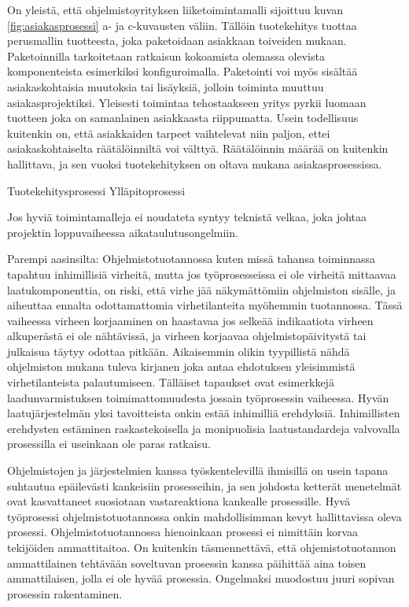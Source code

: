 \documentclass[finnish,12pt,a4paper,pdftex]{article}
\begin{document}
On yleistä, että ohjelmistoyrityksen liiketoimintamalli sijoittuu kuvan \ref{fig:asiakasprosessi} a- ja c-kuvausten väliin. Tällöin tuotekehitys tuottaa perusmallin tuotteesta, joka paketoidaan asiakkaan toiveiden mukaan. Paketoinnilla tarkoitetaan ratkaisun kokoamista olemassa olevista komponenteista esimerkiksi konfiguroimalla. Paketointi voi myös sisältää asiakaskohtaisia muutoksia tai lisäyksiä, jolloin toiminta muuttuu asiakasprojektiksi. Yleisesti toimintaa tehostaakseen yritys pyrkii luomaan tuotteen joka on samanlainen asiakkaasta riippumatta. Usein todellisuus kuitenkin on, että asiakkaiden tarpeet vaihtelevat niin paljon, ettei asiakaskohtaiselta räätälöinniltä voi välttyä. Räätälöinnin määrää on kuitenkin hallittava, ja sen vuoksi tuotekehityksen on oltava mukana asiakasprosessissa. 

Tuotekehitysprosessi
Ylläpitoprosessi

Jos hyviä toimintamalleja ei noudateta syntyy teknistä velkaa, joka johtaa projektin loppuvaiheessa aikataulutusongelmiin.

Parempi aasinsilta:
Ohjelmistotuotannossa kuten missä tahansa toiminnassa tapahtuu inhimillisiä virheitä, mutta jos työprosesseissa ei ole virheitä mittaavaa laatukomponenttia, on riski, että virhe jää näkymättömiin ohjelmiston sisälle, ja aiheuttaa ennalta odottamattomia virhetilanteita myöhemmin tuotannossa. Tässä vaiheessa virheen korjaaminen on haastavaa jos selkeää indikaatiota virheen alkuperästä ei ole nähtävissä, ja virheen korjaavaa ohjelmistopäivitystä tai julkaisua täytyy odottaa pitkään. Aikaisemmin olikin tyypillistä nähdä ohjelmiston mukana tuleva kirjanen joka antaa ehdotuksen yleisimmistä virhetilanteista palautumiseen. Tälläiset tapaukset ovat esimerkkejä laadunvarmistuksen toimimattomuudesta jossain työprosessin vaiheessa. Hyvän laatujärjestelmän yksi tavoitteista onkin estää inhimilliä erehdyksiä. Inhimillisten erehdysten estäminen raskastekoisella ja monipuolisia laatustandardeja valvovalla prosessilla ei useinkaan ole paras ratkaisu.

Ohjelmistojen ja järjestelmien kanssa työskentelevillä ihmisillä on usein tapana suhtautua epäilevästi kankeisiin prosesseihin, ja sen johdosta ketterät menetelmät ovat kasvattaneet suosiotaan vastareaktiona kankealle prosessille. Hyvä työprosessi ohjelmistotuotannossa onkin mahdollisimman kevyt hallittavissa oleva prosessi. Ohjelmistotuotannossa hienoinkaan prosessi ei nimittäin korvaa tekijöiden ammattitaitoa. On kuitenkin täsmennettävä, että ohjemistotuotannon ammattilainen tehtävään soveltuvan prosessin kanssa päihittää aina toisen ammattilaisen, jolla ei ole hyvää prosessia. Ongelmaksi muodostuu juuri sopivan prosessin rakentaminen.
\end{document}
